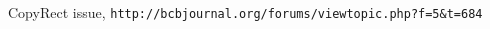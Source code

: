 \begin{thebibliography}{99999}
\singlespace\normalsize
{} CopyRect issue, \texttt{http://bcbjournal.org/forums/viewtopic.php?f=5&t=684}


\end{thebibliography}

